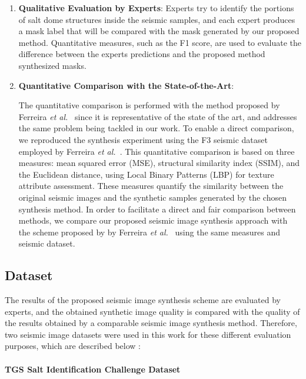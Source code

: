 \documentclass{ieeeaccess}
\begin{document}
\begin{enumerate}
    \item \textbf{Qualitative Evaluation by Experts}: Experts try to identify the portions of salt dome structures inside the seismic samples, and each expert produces a mask label that will be compared with the mask generated by our proposed method. Quantitative measures, such as the F1 score, are used to evaluate the difference between the experts predictions and the proposed method synthesized masks. 
    
    \item \textbf{Quantitative Comparison with the State-of-the-Art}:
    
    The quantitative comparison is performed with the method proposed by Ferreira \emph{et al.}~\cite{Ferreira2020} since it is representative of the state of the art, and addresses the same problem being tackled in our work. To enable a direct comparison, we reproduced the synthesis experiment using the F3 seismic dataset employed by Ferreira \emph{et al.}~\cite{Ferreira2020}. This quantitative comparison is based on three measures: mean squared error (MSE), structural similarity index (SSIM), and the Euclidean distance, using Local Binary Patterns (LBP) for texture attribute assessment. These measures quantify the similarity between the original seismic images and the synthetic samples generated by the chosen synthesis method. In order to facilitate a direct and fair comparison between methods, we compare our proposed  seismic image synthesis approach with the scheme proposed by by Ferreira \emph{et al.}~\cite{Ferreira2020} using the same measures and seismic dataset.
\end{enumerate}


\subsection{Dataset}

The results of the proposed seismic image synthesis scheme are evaluated by experts, and the obtained synthetic image quality is compared with the quality of the results obtained by a comparable seismic image synthesis method. Therefore, two seismic image datasets were used in this work for these different evaluation purposes, which are described below :

\paragraph{TGS Salt Identification Challenge Dataset}
\end{document}
